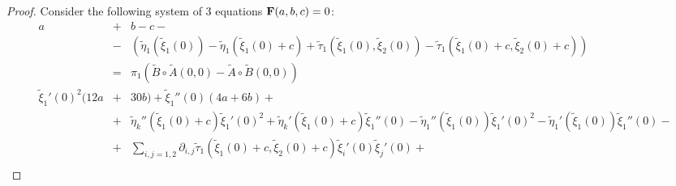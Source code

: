 \begin{proof}
Consider the following system of $3$ equations $\mathbf{F}(a,b,c)=0$:
\begin{eqnarray}
\nonumber a&+&b-c-\\
\nonumber &-&\left(\tilde \eta _1(\tilde \xi_1(0))-\tilde \eta_1(\tilde \xi_1(0)+c)+\tilde \tau_1(\tilde \xi_1(0), \tilde \xi_2(0))-\tilde \tau_1(\tilde \xi_1(0)+c, \tilde \xi_2(0)+c) \right)\\
\nonumber &=& \pi_1( \tilde B \circ \tilde A(0,0)- \tilde A \circ \tilde B(0,0))\\
\nonumber \tilde \xi_1'(0)^2 (12 a &+&30 b)+\tilde \xi_1''(0) (4 a +6 b)+\\
\nonumber &+&\tilde \eta_k''(\tilde \xi_1(0)+c) \tilde \xi_1'(0)^2+\tilde \eta_k'(\tilde \xi_1(0)+c) \tilde \xi_1''(0)-\tilde \eta_1''(\tilde \xi_1(0)) \tilde \xi_1'(0)^2-\tilde \eta_1'(\tilde \xi_1(0)) \tilde \xi_1''(0)-\\
\nonumber&+&\sum_{i,j=1,2}\partial_{i,j}\tilde \tau_1(\tilde \xi_1(0)+c,\tilde \xi_2(0)+c) \tilde \xi_i'(0) \tilde \xi_j'(0)+\\

\end{eqnarray}
\end{proof}
